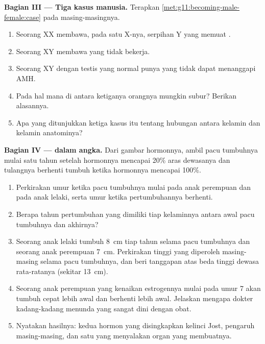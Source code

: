 \begin{problem}
\medskip
\noindent\textbf{Bagian III --- Tiga kasus manusia.}
Terapkan \cref{met:g11:becoming-male-female:case} pada masing-masingnya.
\begin{enumerate}[resume]
  \item Seorang XX membawa, pada satu  X-nya, serpihan Y yang
        memuat .
  \item Seorang XY membawa  yang tidak bekerja.
  \item Seorang XY dengan testis yang normal punya  yang tidak dapat
        menanggapi AMH.
  \item Pada hal mana di antara ketiganya orangnya mungkin subur?
        Berikan alasannya.
  \item Apa yang ditunjukkan ketiga kasus itu tentang hubungan antara
        kelamin  dan kelamin anatominya?
\end{enumerate}

\medskip
\noindent\textbf{Bagian IV ---  dalam angka.}
Dari gambar hormonnya, ambil pacu tumbuhnya mulai satu tahun setelah
hormonnya mencapai 20\% aras dewasanya dan tulangnya berhenti tumbuh
ketika hormonnya mencapai 100\%.
\begin{enumerate}[resume]
  \item Perkirakan umur ketika pacu tumbuhnya mulai pada anak perempuan
        dan pada anak lelaki, serta umur ketika pertumbuhannya berhenti.
  \item Berapa tahun pertumbuhan yang dimiliki tiap kelaminnya antara
        awal pacu tumbuhnya dan akhirnya?
  \item Seorang anak lelaki tumbuh \qty{8}{cm} tiap tahun selama pacu
        tumbuhnya dan seorang anak perempuan \qty{7}{cm}. Perkirakan
        tinggi yang diperoleh masing-masing selama pacu tumbuhnya, dan
        beri tanggapan atas beda tinggi dewasa rata-ratanya (sekitar
        \qty{13}{cm}).
  \item Seorang anak perempuan yang kenaikan estrogennya mulai pada
        umur 7 akan tumbuh cepat lebih awal dan berhenti lebih awal.
        Jelaskan mengapa dokter kadang-kadang menunda  yang
        sangat dini dengan obat.
  \item Nyatakan hasilnya: kedua hormon yang disingkapkan kelinci Jost,
        pengaruh masing-masing, dan satu  yang menyalakan organ yang
        membuatnya.
\end{enumerate}
\end{problem}

